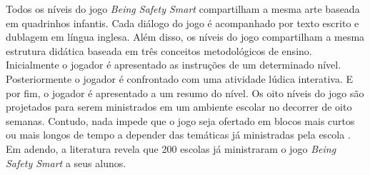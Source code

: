 
Todos os níveis do jogo \textit{Being Safety Smart} compartilham a mesma arte baseada em quadrinhos infantis. Cada diálogo do jogo é acompanhado por texto escrito e dublagem em língua inglesa. Além disso, os níveis do jogo compartilham a mesma estrutura didática baseada em três conceitos metodológicos de ensino. Inicialmente o jogador é apresentado as instruções de um determinado nível. Posteriormente o jogador é confrontado com uma atividade lúdica interativa. E por fim, o jogador é apresentado a um resumo do nível. Os oito níveis do jogo são projetados para serem ministrados em um ambiente escolar no decorrer de oito semanas. Contudo, nada impede que o jogo seja ofertado em blocos mais curtos ou mais longos de tempo a depender das temáticas já ministradas pela escola \cite{jones2010being}. Em adendo, a literatura revela que 200 escolas já ministraram o jogo \textit{Being Safety Smart} a seus alunos.







